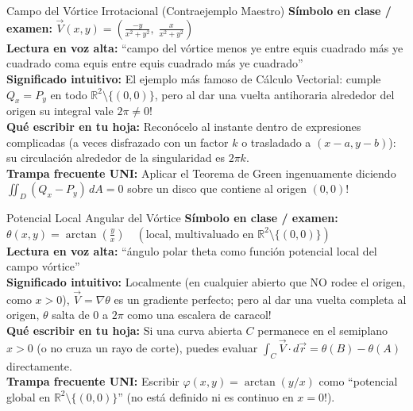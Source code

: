 \documentclass[11pt,a4paper]{article}
\begin{document}
\begin{definicionbox}{Campo del Vórtice Irrotacional (Contraejemplo Maestro)}
\textbf{Símbolo en clase / examen:} $\vec{V}(x,y) = \left( \frac{-y}{x^2+y^2}, \; \frac{x}{x^2+y^2} \right)$\\[0.15cm]
\textbf{Lectura en voz alta:} ``campo del vórtice menos ye entre equis cuadrado más ye cuadrado coma equis entre equis cuadrado más ye cuadrado''\\[0.12cm]
\textbf{Significado intuitivo:} El ejemplo más famoso de Cálculo Vectorial: cumple $Q_x = P_y$ en todo $\mathbb{R}^2 \setminus \{(0,0)\}$, pero al dar una vuelta antihoraria alrededor del origen su integral vale $2\pi \neq 0$!\\[0.12cm]
\textbf{Qué escribir en tu hoja:} Reconócelo al instante dentro de expresiones complicadas (a veces disfrazado con un factor $k$ o trasladado a $(x-a, y-b)$): su circulación alrededor de la singularidad es $2\pi k$.\\[0.12cm]
\textbf{Trampa frecuente UNI:} Aplicar el Teorema de Green ingenuamente diciendo $\iint_D (Q_x - P_y)\,dA = 0$ sobre un disco que contiene al origen $(0,0)$!
\end{definicionbox}

\begin{definicionbox}{Potencial Local Angular del Vórtice}
\textbf{Símbolo en clase / examen:} $\theta(x,y) = \arctan\left(\frac{y}{x}\right) \quad (\text{local, multivaluado en } \mathbb{R}^2\setminus\{(0,0)\})$\\[0.15cm]
\textbf{Lectura en voz alta:} ``ángulo polar theta como función potencial local del campo vórtice''\\[0.12cm]
\textbf{Significado intuitivo:} Localmente (en cualquier abierto que NO rodee el origen, como $x > 0$), $\vec{V} = \nabla\theta$ es un gradiente perfecto; pero al dar una vuelta completa al origen, $\theta$ salta de $0$ a $2\pi$ como una escalera de caracol!\\[0.12cm]
\textbf{Qué escribir en tu hoja:} Si una curva abierta $C$ permanece en el semiplano $x > 0$ (o no cruza un rayo de corte), puedes evaluar $\int_C \vec{V}\cdot d\vec{r} = \theta(B) - \theta(A)$ directamente.\\[0.12cm]
\textbf{Trampa frecuente UNI:} Escribir $\varphi(x,y) = \arctan(y/x)$ como ``potencial global en $\mathbb{R}^2\setminus\{(0,0)\}$'' (no está definido ni es continuo en $x = 0$!).
\end{definicionbox}
\end{document}
